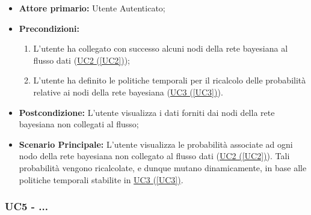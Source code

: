 \begin{itemize}
\item \textbf{Attore primario:} Utente Autenticato;
\item \textbf{Precondizioni:}
	\begin{enumerate}
	\item L'utente ha collegato con successo alcuni nodi della rete bayesiana al flusso dati (\hyperref[UC2]{UC2 (\ref*{UC2})});
	\item L'utente ha definito le politiche temporali per il ricalcolo delle probabilità relative ai nodi della rete bayesiana (\hyperref[UC3]{UC3 (\ref*{UC3})}).
	\end{enumerate}
\item \textbf{Postcondizione:} L'utente visualizza i dati forniti dai nodi della rete bayesiana non collegati al flusso;
\item \textbf{Scenario Principale:} L'utente visualizza le probabilità associate ad ogni nodo della rete bayesiana non collegato al flusso dati (\hyperref[UC2]{UC2 (\ref*{UC2})}). Tali probabilità vengono ricalcolate, e dunque mutano dinamicamente, in base alle politiche temporali stabilite in \hyperref[UC3]{UC3 (\ref*{UC3})}.
\end{itemize}

\pagebreak


\subsubsection{UC5 - ...}\label{UC5}

\pagebreak


